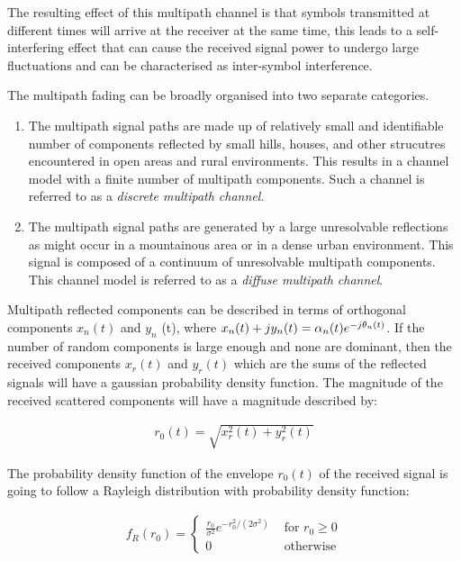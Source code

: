 The resulting effect of this multipath channel is that %
symbols transmitted at different times will arrive %
at the receiver at the same time, this leads to %
a self-interfering effect that can cause the received %
signal power to undergo large fluctuations and can %
be characterised as inter-symbol interference.

The multipath fading can be broadly organised into %
two separate categories\cite{Jer00}.

\begin{enumerate}
	\item{The multipath signal paths are made up %
		of relatively small and identifiable number %
		of components reflected by small hills, %
		houses, and other strucutres encountered in %
		open areas and rural environments. This %
		results in a channel model with a finite number %
		of multipath components. Such a channel is %
		referred to as a \emph{discrete multipath channel}.}
	\item{The multipath signal paths are generated by %
		a large unresolvable reflections as might occur %
		in a mountainous area or in a dense urban environment. %
		This signal is composed of a continuum of %
		unresolvable multipath components. This %
		channel model is referred to as a \emph{diffuse %
		multipath channel}.}
\end{enumerate}

Multipath reflected components can be described in %
terms of orthogonal components $x_{n}(t)$ and %
$y_{n}$%
(t), where $x_{n}(t) + jy_{n}(t) = \alpha_{n}(t)e^{%
-j\theta_{n}(t)}$. If the number of random components %
is large enough and none are dominant, then the received %
components $x_{r}(t)$ and $y_{r}(t)$ which are the sums %
of the reflected signals will have a gaussian probability %
density function. The magnitude of the received scattered %
components will have a magnitude described by:

\begin{align}
	r_{0}(t) = \sqrt{x_{r}^{2}(t) + y_{r}^{2}(t)}
\end{align}

The probability density function of the envelope $r_{0}(t)$ %
of the received signal is going to follow a Rayleigh distribution %
with probability density function:

\begin{align}
	f_{R}(r_{0}) = \begin{cases}
		\frac{r_{0}}{\sigma^{2}}e^{-r_{0}^{2}/(2\sigma^{2})} %
		& \text{ for } r_{0} \geq 0 \\
		0 & \text{ otherwise}
	\end{cases}
	\label{eq:RayleighPDF}
\end{align}

